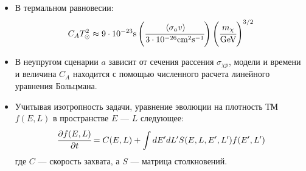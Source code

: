 \begin{itemize}
	\item В термальном равновесии:
	\begin{equation*}
		C_A T_{\odot}^2 \approx
		9\cdot10^{-23} \text{s}	\left(\cfrac{   \left\langle \sigma_{a}v \right\rangle    }{3\cdot10^{-26} \text{cm}^2\text{s}^{-1}} \right)
		\left(\cfrac{m_{\chi}}{\text{GeV}}\right)^{3/2}
	\end{equation*}
	\item В неупругом сценарии $a$ зависит от сечения рассения $\sigma_{\chi p}$, модели и времени и величина $C_A$ находится с помощью численного расчета линейного уравнения Больцмана.
	\item Учитывая изотропность задачи, уравнение эволюции на плотность ТМ $f(E,L)$ в пространстве $E$ --- $L$ следующее:
	\begin{equation*}
			\cfrac{\partial f(E,L)}{\partial t} = C(E,L)
			+ \int{dE'dL' S(E,L,E',L') f(E',L')}
	\end{equation*}
	где $C$ --- скорость захвата, а $S$ --- матрица столкновений.
\end{itemize}



